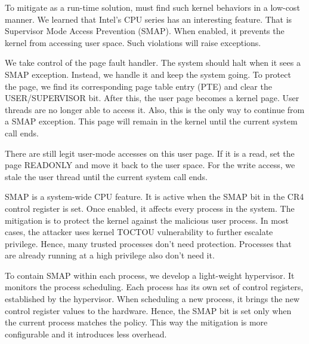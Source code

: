 To mitigate as a run-time solution, must find such kernel behaviors in a low-cost manner. We learned that Intel's CPU series has an interesting feature. That is Supervisor Mode Access Prevention (SMAP). When enabled, it prevents the kernel from accessing user space. Such violations will raise exceptions. %

We take control of the page fault handler.  The system should halt when it sees a SMAP exception.  Instead, we handle it and keep the system going. To protect the page, we find its corresponding page table entry (PTE) and clear the USER/SUPERVISOR bit. After this, the user page becomes a kernel page. User threads are no longer able to access it. Also, this is the only way to continue from a SMAP exception.  This page will remain in the kernel until the current system call ends.

There are still legit user-mode accesses on this user page. If it is a read, set the page READONLY and move it back to the user space. 
For the write access, we stale the user thread until the current system call ends.


SMAP is a system-wide CPU feature. It is active when the SMAP bit in the CR4 control register is set.  Once enabled, it affects every process in the system. The mitigation is to protect the kernel against the malicious user process. In most cases, the attacker uses kernel TOCTOU vulnerability to further escalate privilege. Hence, many trusted processes don't need protection. Processes that are already running at a high privilege also don't need it. 

To contain SMAP within each process, we develop a light-weight hypervisor. It monitors the process scheduling. Each process has its own set of control registers, established by the hypervisor. When scheduling a new process, it brings the new control register values to the hardware. Hence, the SMAP bit is set only when the current process matches the policy. This way the mitigation is more configurable and it introduces less overhead.

